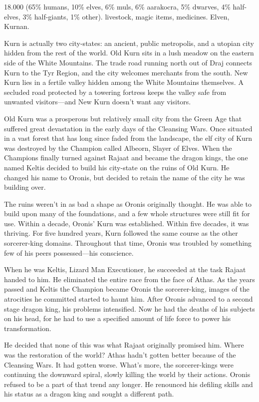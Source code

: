 
{18.000 (65\% humans, 10\% elves, 6\% muls, 6\% aarakocra, 5\% dwarves, 4\% half-elves, 3\% half-giants, 1\% other).}
{livestock, magic items, medicines.}
{Elven, Kurnan.}
{
	Kurn is actually two city-states: an ancient, public metropolis, and a utopian city hidden from the rest of the world. Old Kurn sits in a lush meadow on the eastern side of the White Mountains. The trade road running north out of Draj connects Kurn to the Tyr Region, and the city welcomes merchants from the south. New Kurn lies in a fertile valley hidden among the White Mountains themselves. A secluded road protected by a towering fortress keeps the valley safe from unwanted visitors---and New Kurn doesn't want any visitors.

	Old Kurn was a prosperous but relatively small city from the Green Age that suffered great devastation in the early days of the Cleansing Wars. Once situated in a vast forest that has long since faded from the landscape, the elf city of Kurn was destroyed by the Champion called Albeorn, Slayer of Elves. When the Champions finally turned against Rajaat and became the dragon kings, the one named Keltis decided to build his city-state on the ruins of Old Kurn. He changed his name to Oronis, but decided to retain the name of the city he was building over.

	The ruins weren't in as bad a shape as Oronis originally thought. He was able to build upon many of the foundations, and a few whole structures were still fit for use. Within a decade, Oronis' Kurn was established. Within five decades, it was thriving. For five hundred years, Kurn followed the same course as the other sorcerer-king domains. Throughout that time, Oronis was troubled by something few of his peers possessed---his conscience.

	When he was Keltis, Lizard Man Executioner, he succeeded at the task Rajaat handed to him. He eliminated the entire race from the face of Athas. As the years passed and Keltis the Champion became Oronis the sorcerer-king, images of the atrocities he committed started to haunt him. After Oronis advanced to a second stage dragon king, his problems intensified. Now he had the deaths of his subjects on his head, for he had to use a specified amount of life force to power his transformation.

	He decided that none of this was what Rajaat originally promised him. Where was the restoration of the world? Athas hadn't gotten better because of the Cleansing Wars. It had gotten worse. What's more, the sorcerer-kings were continuing the downward spiral, slowly killing the world by their actions. Oronis refused to be a part of that trend any longer. He renounced his defiling skills and his status as a dragon king and sought a different path.

}
